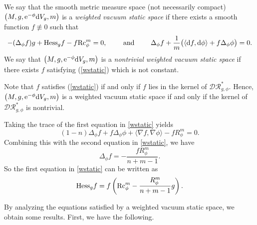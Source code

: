 \documentclass[10pt,a4paper]{amsart}
\numberwithin{equation}{section}
\begin{document}
\begin{Definition}\label{def_wstatic}
We say that the smooth metric measure space (not necessarily compact) $\bigl(M,g,{\rm e}^{-\phi}{\rm d}V_g,m\bigr)$ is a \textit{weighted vacuum static space} if there exists a smooth function $f\not\equiv 0$ such that
\begin{equation}\label{wstatic}
 -(\Delta_\phi f)g+{\rm Hess}_gf-f{\rm Rc}_\phi^m=0,\qquad\textrm{ and } \qquad \Delta_\phi f+\frac{1}{m}\bigl(\langle {\rm d}f,{\rm d}\phi\rangle+f\Delta_\phi\phi\bigr)=0.
\end{equation}
We say that $\bigl(M,g,{\rm e}^{-\phi}{\rm d}V_g,m\bigr)$ is a \textit{nontrivial weighted vacuum static space}
if there exists $f$ satisfying (\ref{wstatic}) which is not constant.
\end{Definition}

Note that $f$ satisfies (\ref{wstatic}) if and only if
$f$ lies in the kernel of $\mathcal{DR}^*_{g,\phi}$.
Hence, $\bigl(M,g,{\rm e}^{-\phi}{\rm d}V_g,m\bigr)$ is a weighted vacuum static space
if and only if the kernel of $\mathcal{DR}^*_{g,\phi}$ is nontrivial.

Taking the trace of the first equation in \eqref{wstatic} yields
\begin{equation*}
 (1-n)\Delta_\phi f+f\Delta_\phi\phi+\langle \nabla f,\nabla \phi\rangle -fR_\phi^m=0.
\end{equation*}
Combining this with the second equation in \eqref{wstatic}, we have
\begin{equation}\label{wstatic_del}
 \Delta_\phi f=-\frac{f R_\phi^m}{n+m-1}.
\end{equation}
So the first equation in \eqref{wstatic} can be written as
\begin{equation}\label{wstatic2}
{\rm Hess}_gf=f\left({\rm Rc}_\phi^m-\frac{R_\phi^m}{n+m-1}g\right).
\end{equation}

By analyzing the equations satisfied by a weighted vacuum static space,
we obtain some results. First, we have the following.
\end{document}
